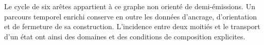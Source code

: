 Le cycle de six arêtes appartient à ce graphe non orienté de
demi-émissions. Un parcours temporel enrichi conserve en outre les
données d'ancrage, d'orientation et de fermeture de sa construction. L'incidence
entre deux moitiés et le transport d'un état ont ainsi des domaines et des
conditions de composition explicites.
